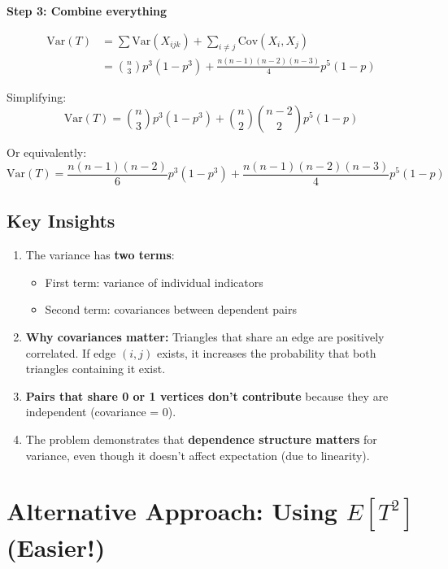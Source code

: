 \documentclass[11pt]{article}
\begin{document}
\vspace{0.5em}

\textbf{Step 3: Combine everything}

\begin{align*}
\text{Var}(T) &= \sum \text{Var}(X_{ijk}) + \sum_{i \neq j} \text{Cov}(X_i, X_j) \\
&= \binom{n}{3} p^3(1-p^3) + \frac{n(n-1)(n-2)(n-3)}{4} p^5(1-p)
\end{align*}

Simplifying:
\[
\boxed{\text{Var}(T) = \binom{n}{3} p^3(1-p^3) + \binom{n}{2}\binom{n-2}{2} p^5(1-p)}
\]

Or equivalently:
\[
\boxed{\text{Var}(T) = \frac{n(n-1)(n-2)}{6} p^3(1-p^3) + \frac{n(n-1)(n-2)(n-3)}{4} p^5(1-p)}
\]

\vspace{1em}

\subsection*{Key Insights}

\begin{enumerate}[leftmargin=2em]
    \item The variance has \textbf{two terms}:
    \begin{itemize}
        \item First term: variance of individual indicators
        \item Second term: covariances between dependent pairs
    \end{itemize}

    \item \textbf{Why covariances matter:} Triangles that share an edge are positively correlated. If edge $(i,j)$ exists, it increases the probability that both triangles containing it exist.

    \item \textbf{Pairs that share 0 or 1 vertices don't contribute} because they are independent (covariance = 0).

    \item The problem demonstrates that \textbf{dependence structure matters} for variance, even though it doesn't affect expectation (due to linearity).
\end{enumerate}

\vspace{2em}

\section*{Alternative Approach: Using $E[T^2]$ (Easier!)}
\end{document}
